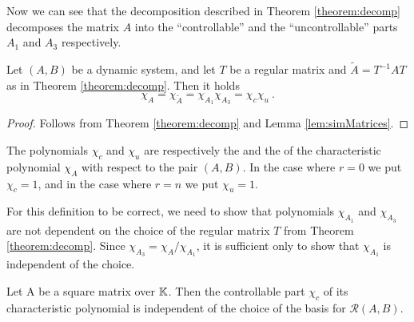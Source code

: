 Now we can see that the decomposition described in Theorem \ref{theorem:decomp} decomposes the matrix $A$ into the ``controllable'' and the ``uncontrollable'' parts $A_1$ and $A_3$ respectively.

\begin{cor}
	Let $(A,B)$ be a dynamic system, and let $T$ be a regular matrix and $\widetilde{A}=T^{-1}AT$ as in Theorem \ref{theorem:decomp}. Then it holds
	$$\chi_A=\chi_{\widetilde{A}}=\chi_{A_1}\chi_{A_3}=\chi_c\chi_u\ .$$
\end{cor} 

\begin{proof}
	Follows from Theorem \ref{theorem:decomp} and Lemma \ref{lem:simMatrices}.
\end{proof}

\begin{definition}
	The polynomials $\chi_c$ and $\chi_u$ are respectively the  and the  of the characteristic polynomial $\chi_A$ with respect to the pair $(A,B)$. In the case where $r=0$ we put $\chi_c=1$, and in the case where $r=n$ we put $\chi_u=1$.
\end{definition}

For this definition to be correct, we need to show that polynomials $\chi_{A_1}$ and $\chi_{A_3}$ are not dependent on the choice of the regular matrix $T$ from Theorem \ref{theorem:decomp}. Since $\chi_{A_3}=\chi_A/\chi_{A_1}$, it is sufficient only to show that $\chi_{A_1}$ is independent of the choice.

\begin{lemma}
	Let A be a square matrix over $\mathbb{K}$. Then the controllable part $\chi_c$ of its characteristic polynomial is independent of the choice of the basis for $\mathcal{R}(A,B)$.
\end{lemma}

